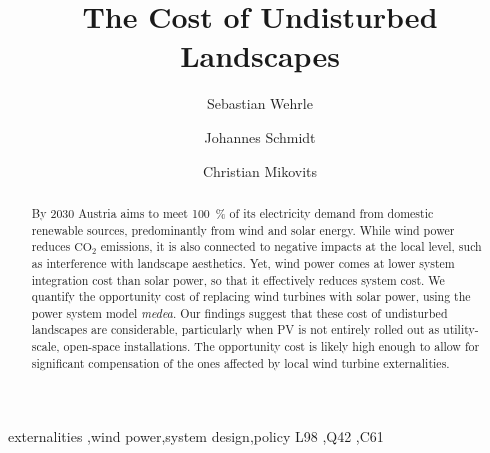 \documentclass[review, 3p, times, 12pt]{elsarticle} %
\newcommand{\COO}{\ensuremath{\mathrm{CO_2}} }
\begin{document}
\begin{frontmatter}
\title{The Cost of Undisturbed Landscapes}
\author[1]{Sebastian Wehrle}
\author[1]{Johannes Schmidt}
\author[1]{Christian Mikovits}
\address[1]{Institute for Sustainable Economic Development, University of Natural Resources and Life Sciences,
Feistmantelstrasse 4, 1180 Vienna, Austria}

\begin{abstract}
By 2030 Austria aims to meet \SI{100}{\percent} of its electricity demand from domestic renewable sources, predominantly from wind and solar energy.
While wind power reduces \COO emissions, it is also connected to negative impacts at the local level, such as interference with landscape aesthetics.
Yet, wind power comes at lower system integration cost than solar power, so that it effectively reduces system cost.
We quantify the opportunity cost of replacing wind turbines with solar power, using the power system model \emph{medea}.
Our findings suggest that these cost of undisturbed landscapes are considerable, particularly when PV is not entirely rolled out as utility-scale, open-space installations.
The opportunity cost is likely high enough to allow for significant compensation of the ones affected by local wind turbine externalities.
\end{abstract}

\begin{keyword}
externalities \sep wind power\sep system design\sep policy
\JEL L98 \sep Q42 \sep C61
\end{keyword}
\end{frontmatter}
\newpage

\end{document}
